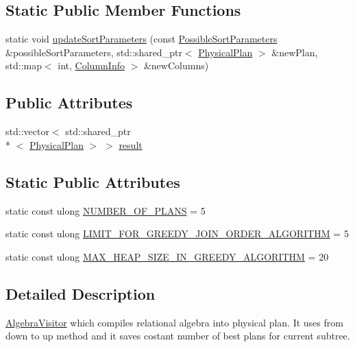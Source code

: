 \subsection*{Static Public Member Functions}
\begin{DoxyCompactItemize}
\item 
static void \hyperlink{classrafe_1_1_algebra_compiler_a022cd6fb926e97863aa302d8c85ba07c}{update\+Sort\+Parameters} (const \hyperlink{classrafe_1_1_possible_sort_parameters}{Possible\+Sort\+Parameters} \&possible\+Sort\+Parameters, std\+::shared\+\_\+ptr$<$ \hyperlink{classrafe_1_1_physical_plan}{Physical\+Plan} $>$ \&new\+Plan, std\+::map$<$ int, \hyperlink{classrafe_1_1_column_info}{Column\+Info} $>$ \&new\+Columns)
\end{DoxyCompactItemize}
\subsection*{Public Attributes}
\begin{DoxyCompactItemize}
\item 
std\+::vector$<$ std\+::shared\+\_\+ptr\\*
$<$ \hyperlink{classrafe_1_1_physical_plan}{Physical\+Plan} $>$ $>$ \hyperlink{classrafe_1_1_algebra_compiler_a10ef60b632a1f593c0bbe3bbf5c3263c}{result}
\end{DoxyCompactItemize}
\subsection*{Static Public Attributes}
\begin{DoxyCompactItemize}
\item 
static const ulong \hyperlink{classrafe_1_1_algebra_compiler_afe381cc19b6dc860178b4a8783b51237}{N\+U\+M\+B\+E\+R\+\_\+\+O\+F\+\_\+\+P\+L\+A\+N\+S} = 5
\item 
static const ulong \hyperlink{classrafe_1_1_algebra_compiler_a576956fab718e7571201ffa24934b000}{L\+I\+M\+I\+T\+\_\+\+F\+O\+R\+\_\+\+G\+R\+E\+E\+D\+Y\+\_\+\+J\+O\+I\+N\+\_\+\+O\+R\+D\+E\+R\+\_\+\+A\+L\+G\+O\+R\+I\+T\+H\+M} = 5
\item 
static const ulong \hyperlink{classrafe_1_1_algebra_compiler_a19d056b84b6ee3621cf98d0d32bce141}{M\+A\+X\+\_\+\+H\+E\+A\+P\+\_\+\+S\+I\+Z\+E\+\_\+\+I\+N\+\_\+\+G\+R\+E\+E\+D\+Y\+\_\+\+A\+L\+G\+O\+R\+I\+T\+H\+M} = 20
\end{DoxyCompactItemize}


\subsection{Detailed Description}
\hyperlink{classrafe_1_1_algebra_visitor}{Algebra\+Visitor} which compiles relational algebra into physical plan. It uses from down to up method and it saves costant number of best plans for current subtree. 

